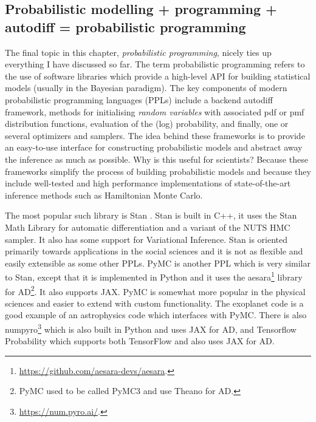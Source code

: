 \documentclass[12pt,dvipsnames]{report}
\newcommand{\ssf}[1]{\textsf{#1}}
\begin{document}
\subsection{Probabilistic modelling + programming + autodiff = probabilistic programming}
The final topic in this chapter, \emph{probabilistic programming}, nicely ties up everything 
I have discussed so far.
The term probabilistic programming refers to the use of software libraries 
which  provide a high-level API for building statistical models (usually in 
the Bayesian paradigm). 
The key components of modern probabilistic programming languages (PPLs) include a backend
autodiff framework, methods for initialising \emph{random variables} with 
associated pdf or pmf distribution functions, evaluation of the (log) probability, 
and finally, one or several optimizers and samplers. The idea behind these 
frameworks is to provide an easy-to-use interface for constructing probabilistic 
models and abstract away the inference as much as possible.
Why is this useful for scientists? Because these frameworks simplify the process  
of building probabilistic  models and because they include well-tested and high
performance implementations of state-of-the-art inference methods such as 
Hamiltonian Monte Carlo. 

The most popular such library is \ssf{Stan} \citep{2017JSS....76....1C}. 
Stan is built in \ssf{C++}, it uses the \ssf{Stan Math Library} for automatic 
differentiation and a variant of the NUTS HMC sampler. It also has some 
support for Variational Inference. \ssf{Stan} is oriented primarily towards 
applications in the social sciences and it is not as flexible and easily extensible 
as some other PPLs. \ssf{PyMC} is another PPL which is very similar to 
\ssf{Stan}, except that it is implemented in \ssf{Python} and it uses 
the \ssf{aesara}\footnote{\url{https://github.com/aesara-devs/aesara}.} library 
for AD\footnote{\ssf{PyMC} used to be called \ssf{PyMC3} and use \ssf{Theano} for AD.}. 
It also supports \ssf{JAX}. 
\ssf{PyMC} is somewhat more popular in the physical sciences and easier to 
extend  with custom functionality. The \ssf{exoplanet} code 
\citep{2021JOSS....6.3285F} is a good example of an astrophysics code which 
interfaces with \ssf{PyMC}.  
There is also 
\ssf{numpyro}\footnote{\url{https://num.pyro.ai/}.}
\citep{arXiv:1912.11554} which is also built in \ssf{Python} and uses 
\ssf{JAX} for AD, and \ssf{Tensorflow Probability} \citep{arXiv:1711.10604} 
which supports both \ssf{TensorFlow} and also uses \ssf{JAX} for AD. 
\end{document}

